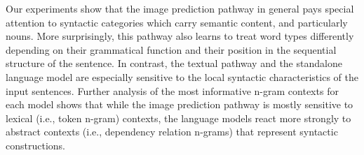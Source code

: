 Our experiments show that the image prediction pathway in general 
pays special attention to syntactic categories which carry semantic 
content, and particularly nouns. More surprisingly, this pathway also 
learns to treat word types differently depending on their 
grammatical function and their position in the sequential structure of 
the sentence. In contrast, the textual pathway and the standalone 
language model are especially sensitive to the local syntactic 
characteristics of the input sentences.  Further analysis of the most 
informative n-gram contexts for each model shows that while the image 
prediction pathway is mostly sensitive to lexical (i.e., token n-gram) 
contexts, the language models react more strongly to abstract contexts
(i.e., dependency relation n-grams) that represent syntactic constructions. 



%


